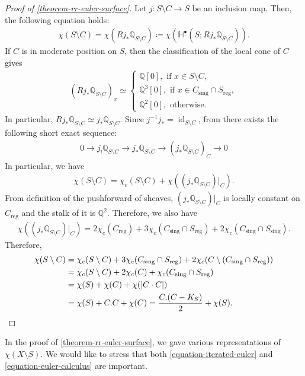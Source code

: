 \documentclass[a4paper,dvipdfmx,reqno,12pt]{amsart}
\theoremstyle{definition}
\newcommand{\deq}{\coloneqq}
\newcommand{\opn}[1]{\operatorname{#1}}
\numberwithin{equation}{section}
\begin{document}
\begin{proof}[{Proof of \cref{theorem-rr-euler-surface}}]
Let
$j\colon S\setminus C\to S$ be an inclusion map.
Then, the following equation holds:
\begin{align}
\chi(S\setminus C)=\chi(Rj_*\mathbb{Q}_{S\setminus C})
\deq \chi(\mathbb{H}^{\bullet}(S;Rj_*\mathbb{Q}_{S\setminus C})).
\end{align}
If $C$ is in moderate position on $S$, then
the classification of the local cone of $C$ gives 
\begin{align}
(Rj_*\mathbb{Q}_{S\setminus C})_x
\simeq
\begin{cases}
\mathbb{Q}[0], \text{ if } x\in S\setminus C, \\
\mathbb{Q}^3[0], \text{ if } x\in C_{\mathrm{sing}}
\cap S_{\mathrm{reg}}, \\
\mathbb{Q}^2[0], \text{ otherwise.}  
\end{cases}  
\end{align}
In particular, $Rj_*\mathbb{Q}_{S\setminus C}\simeq
j_*\mathbb{Q}_{S\setminus C}$.
Since $j^{-1}j_*=\opn{id}_{S\setminus C}$,  
from \cite[Proposition 2.3.6 (v)]{MR1299726}
there exists the following short exact sequence:
\begin{align}
0\to j_!\mathbb{Q}_{S\setminus C} 
\to j_* \mathbb{Q}_{S\setminus C}
\to (j_*\mathbb{Q}_{S\setminus C})_{C} \to 0
\end{align}
In particular, we have
\begin{align}
\chi(S\setminus C)=
\chi_c(S\setminus C)+\chi((j_*\mathbb{Q}_{S\setminus C})|_C).
\end{align}
From definition of the pushforward of sheaves, 
$(j_*\mathbb{Q}_{S\setminus C})|_C$ is locally constant 
on $C_{\opn{reg}}$ and the stalk of it is $\mathbb{Q}^2$.
Therefore, we also have
\begin{align}
\chi((j_*\mathbb{Q}_{S\setminus C})|_C)=
2\chi_c(C_{\mathrm{reg}})+
3\chi_c(C_{\mathrm{sing}}\cap S_{\mathrm{reg}})+
2\chi_c(C_{\mathrm{sing}}\cap S_{\mathrm{sing}}).
\end{align}
Therefore, 
\begin{align}
\label{equation-euler-calculus}
\chi(S\setminus C)&=
\chi_c(S\setminus C)+
3\chi_c(C_{\mathrm{sing}}
\cap S_{\mathrm{reg}})+
2\chi_c(C\setminus (C_{\mathrm{sing}}
\cap S_{\mathrm{reg}}))\\
&=\chi_c(S\setminus C)+2\chi_c(C)+
\chi_c(C_{\mathrm{sing}}
\cap S_{\mathrm{reg}}) \notag \\
&=\chi(S)+\chi(C)+\chi(|C\cdot C|) 
\label{equation-iterated-euler} \\
&=\chi(S)+C.C+\chi(C)
=\frac{C.(C-K_S)}{2}+\chi(S). \notag
\end{align}
\end{proof}
In the proof of \cref{theorem-rr-euler-surface}, we gave
various representations of $\chi(X\setminus S)$.
We would like to stress that both
\eqref{equation-iterated-euler} and 
\eqref{equation-euler-calculus} are important.
\end{document}
